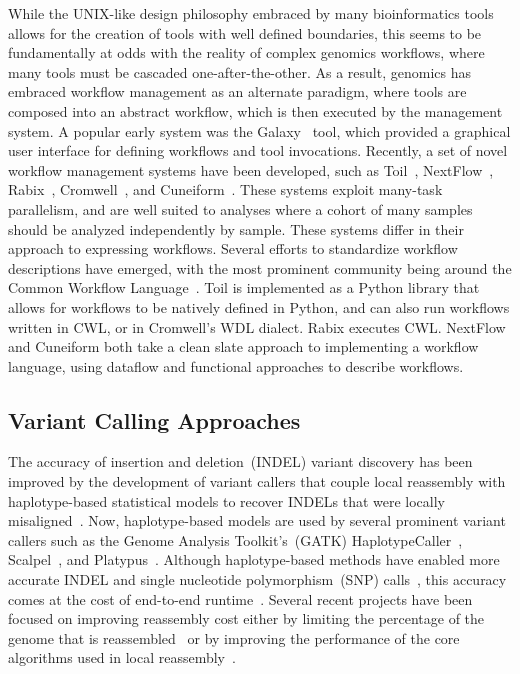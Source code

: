 \documentclass[phd]{ucbthesis}
\begin{document}
While the UNIX-like design philosophy embraced by many bioinformatics tools
allows for the creation of tools with well defined boundaries, this seems to be
fundamentally at odds with the reality of complex genomics workflows, where many
tools must be cascaded one-after-the-other. As a result, genomics has embraced
workflow management as an alternate paradigm, where tools are composed into an
abstract workflow, which is then executed by the management system. A popular
early system was the {Galaxy}~\cite{goecks10} tool, which provided a
graphical user interface for defining workflows and tool invocations. Recently,
a set of novel workflow management systems have been developed, such as
{Toil}~\cite{vivian17}, {NextFlow}~\cite{ditommaso17},
{Rabix}~\cite{kaushik16}, {Cromwell}~\cite{cromwell},
and {Cuneiform}~\cite{brandt15}. These systems exploit many-task
parallelism, and are well suited to analyses where a cohort of many samples
should be analyzed independently by sample. These systems differ in their
approach to expressing workflows. Several efforts to standardize workflow
descriptions have emerged, with the most prominent community being around the
{Common Workflow Language}~\cite{cwl}. {Toil} is implemented as
a Python library that allows for workflows to be natively defined in Python,
and can also run workflows written in CWL, or in {Cromwell}'s WDL
dialect. {Rabix} executes CWL. {NextFlow} and {Cuneiform}
both take a clean slate approach to implementing a workflow language, using
dataflow and functional approaches to describe workflows.

\subsection{Variant Calling Approaches}
\label{sec:variant-calling-approaches}

The accuracy of insertion and deletion~(INDEL) variant discovery has been improved by the development
of variant callers that couple local reassembly with haplotype-based statistical models to recover INDELs
that were locally misaligned~\cite{albers11}. Now, haplotype-based models are used by several prominent variant callers such as the Genome
Analysis Toolkit's~(GATK) {HaplotypeCaller}~\cite{depristo11}, {Scalpel}~\cite{narzisi14}, and
{Platypus}~\cite{rimmer14}. Although haplotype-based methods have enabled more accurate INDEL
and single nucleotide polymorphism~(SNP) calls~\cite{bao14}, this accuracy comes at the cost of
end-to-end runtime~\cite{talwalkar14}. Several recent projects have been focused on improving
reassembly cost either by limiting the percentage of the genome that is reassembled~\cite{bloniarz14} or
by improving the performance of the core algorithms used in local reassembly~\cite{rimmer14}.
\end{document}
